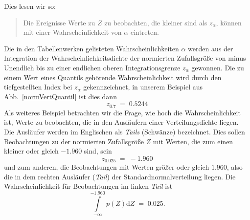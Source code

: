 Dies lesen wir so:
\begin{quote}
Die Ereignisse Werte zu $Z$ zu beobachten, die kleiner sind als $z_\alpha$, können
mit einer Wahrscheinlichkeit von $\alpha$ eintreten.
\end{quote}
Die in den Tabellenwerken gelisteten Wahrscheinlichkeiten $\alpha$ werden
aus der Integration der Wahrscheinlichkeitsdichte der normierten Zufallsgröße
von minus Unendlich bis zu einer endlichen oberen Integrationsgrenze $z_\alpha$
gewonnen.
Die zu einem Wert eines Quantils gehörende Wahrscheinlichkeit wird durch den tiefgestellten
Index bei $z_\alpha$ gekennzeichnet, in unserem Beispiel aus Abb.~\ref{normVertQuantil}
ist dies dann
$$
z_{0.7} \; = \; 0.5244
$$
Als weiteres Beispiel betrachten wir die Frage, wie hoch die Wahrscheinlichkeit ist,
Werte zu beobachten, die in den Ausläufern einer Verteilungsdichte liegen.
Die Ausläufer werden im Englischen
als \textsl{Tails} (Schwänze) bezeichnet. Dies sollen Beobachtungen zu der normierten
Zufallsgröße $Z$ mit Werten, die zum einen kleiner oder gleich $-1.960$ sind, sein
$$
z_{0.025} \; = \; -1.960
$$
und zum anderen, die Beobachtungen mit Werten größer oder gleich $1.960$, also die
in dem rechten Ausläufer (\textsl{Tail}) der Standardnormalverteilung liegen.
Die Wahrscheinlichkeit für Beobachtungen im linken \textsl{Tail} ist
\begin{equation*}
\int\limits_{-\infty}^{-1.960} p(Z) \mathrm{d} Z \; = \; 0.025 .
\end{equation*}

